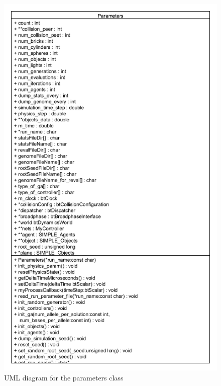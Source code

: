 \begin{figure}[h]
\centering
\includegraphics[scale=0.5]{Chapter2/images/parameters_uml.png}
\caption{UML diagram for the parameters class}
\label{fig:param_uml}
\end{figure}


